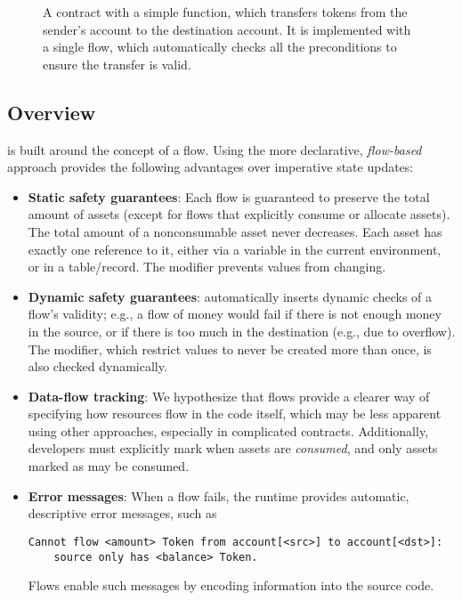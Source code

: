 \documentclass[nonacm, dvipsnames, sigconf]{acmart}
\begin{document}
\begin{figure}
    \centering
    
    \caption{A \langName contract with a simple  function, which transfers  tokens from the sender's account to the destination account.
It is implemented with a single flow, which automatically checks all the preconditions to ensure the transfer is valid.}
    \label{fig:erc20-transfer-flow}
\end{figure}

\subsection{Overview}

\langName is built around the concept of a flow.
Using the more declarative, \emph{flow-based} approach provides the following advantages over imperative state updates:
\begin{itemize}
    \item \textbf{Static safety guarantees}: Each flow is guaranteed to preserve the total amount of assets (except for flows that explicitly consume or allocate assets). %
        The total amount of a nonconsumable asset never decreases.
        Each asset has exactly one reference to it, either via a variable in the current environment, or in a table/record.
        The  modifier prevents values from changing.
    \item \textbf{Dynamic safety guarantees}: \langName automatically inserts dynamic checks of a flow's validity; e.g., a flow of money would fail if there is not enough money in the source, or if there is too much in the destination (e.g., due to overflow).
        The  modifier, which restrict values to never be created more than once, is also checked dynamically.
    \item \textbf{Data-flow tracking}: We hypothesize that flows provide a clearer way of specifying how resources flow in the code itself, which may be less apparent using other approaches, especially in complicated contracts.
        Additionally, developers must explicitly mark when assets are \emph{consumed}, and only assets marked as  may be consumed.
    \item \textbf{Error messages}: When a flow fails, the \langName runtime provides automatic, descriptive error messages, such as
\begin{lstlisting}[numbers=none, basicstyle=\small\ttfamily, xleftmargin=-5.0ex]
Cannot flow <amount> Token from account[<src>] to account[<dst>]:
    source only has <balance> Token.
\end{lstlisting}
        Flows enable such messages by encoding information into the source code.
\end{itemize}
\end{document}

